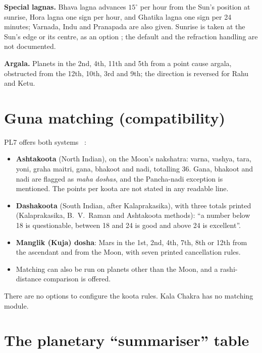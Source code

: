 \textbf{Special lagnas.} Bhava lagna advances $15^\circ$ per hour from the Sun's position at
sunrise, Hora lagna one sign per hour, and Ghatika lagna one sign per 24 minutes; Varnada,
Indu and Pranapada are also given. Sunrise is taken at the Sun's edge or its centre, as an
option \parencite[p.~192]{geovision2006pl7}; the default and the refraction handling are not
documented.

\textbf{Argala.} Planets in the 2nd, 4th, 11th and 5th from a point cause argala, obstructed
from the 12th, 10th, 3rd and 9th; the direction is reversed for Rahu and Ketu.

\section{Guna matching (compatibility)}
\label{sec:guna}

PL7 offers both systems \tagDOC\ \parencite[pp.~104--106]{geovision2006pl7}:

\begin{itemize}[leftmargin=*]
  \item \textbf{Ashtakoota} (North Indian), on the Moon's nakshatra: varna, vashya, tara,
  yoni, graha maitri, gana, bhakoot and nadi, totalling 36. Gana, bhakoot and nadi are
  flagged as \emph{maha doshas}, and the Pancha-nadi exception is mentioned. The points per
  koota are not stated in any readable line.
  \item \textbf{Dashakoota} (South Indian, after Kalaprakasika), with three totals printed
  (Kalaprakasika, B.~V.~Raman and Ashtakoota methods): ``a number below 18 is questionable,
  between 18 and 24 is good and above 24 is excellent''.
  \item \textbf{Manglik (Kuja) dosha}: Mars in the 1st, 2nd, 4th, 7th, 8th or 12th from the
  ascendant and from the Moon, with seven printed cancellation rules.
  \item Matching can also be run on planets other than the Moon, and a rashi-distance
  comparison is offered.
\end{itemize}

There are no options to configure the koota rules. Kala Chakra has no matching module.

\section{The planetary ``summariser'' table}
\label{sec:summary}

